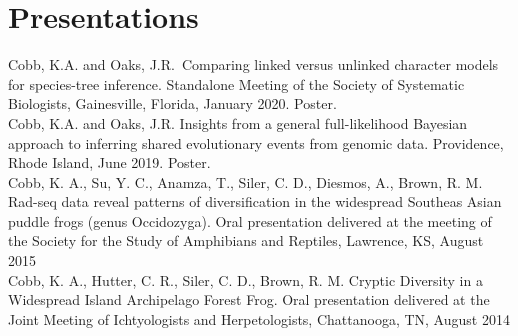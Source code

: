 \section*{Presentations}

Cobb, K.A. and Oaks, J.R. Comparing linked versus unlinked character models
for species-tree inference. Standalone Meeting of the Society of Systematic
Biologists, Gainesville, Florida, January 2020. Poster. \\

Cobb, K.A. and Oaks, J.R. Insights from a general full-likelihood Bayesian
approach to inferring shared evolutionary events from genomic data. Providence,
Rhode Island, June 2019. Poster. \\

Cobb, K. A., Su, Y. C., Anamza, T., Siler, C. D., Diesmos, A., Brown, R. M.
Rad-seq data reveal patterns of diversification in the widespread Southeas
Asian puddle frogs (genus Occidozyga). Oral presentation delivered at the
meeting of the Society for the Study of Amphibians and Reptiles, Lawrence,
KS, August 2015 \\

Cobb, K. A., Hutter, C. R., Siler, C. D., Brown, R. M. Cryptic Diversity
in a Widespread Island Archipelago Forest Frog. Oral presentation delivered
at the Joint Meeting of Ichtyologists and Herpetologists, Chattanooga, TN,
August 2014 \\

